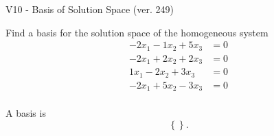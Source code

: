 \begin{exercise}
  \begin{exerciseTitle}V10 - Basis of Solution Space (ver. 249)\end{exerciseTitle}
  \begin{exerciseStatement}
    Find a basis for the solution space of the homogeneous system 
\begin{align*}
 -2 x_ 1 -1 x_ 2 + 5 x_ 3 &= 0  \\ 
  -2 x_ 1 + 2 x_ 2 + 2 x_ 3 &= 0  \\ 
  1 x_ 1 -2 x_ 2 + 3 x_ 3 &= 0  \\ 
  -2 x_ 1 + 5 x_ 2 -3 x_ 3 &= 0  \\ 
 \end{align*}


 
  \end{exerciseStatement}

  \begin{exerciseAnswer}
   A basis is   
\[\left\{\right\}.\]

  


  \end{exerciseAnswer}
\end{exercise}